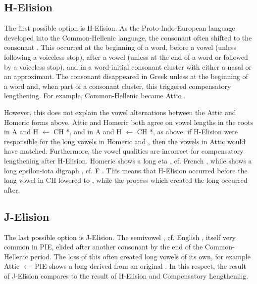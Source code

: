 \subsection{H-Elision}
 The first possible option is H-Elision. As the Proto-Indo-European language developed into the Common-Hellenic language, the consonant  often shifted to the consonant . This occurred at the beginning of a word, before a vowel (unless following a voiceless stop), after a vowel (unless at the end of a word or followed by a voiceless stop), and in a word-initial consonant cluster with either a nasal or an approximant.\autocite[168-172]{Smyth_2013}  The consonant  disappeared in Greek unless at the beginning of a word and, when part of a consonant cluster, this triggered compensatory lengthening. For example, Common-Hellenic  became Attic .\autocite[]{Beekes_2009}

 However, this does not explain the vowel alternations between the Attic and Homeric forms above. Attic and Homeric both agree on vowel lengths in the roots  in A  and H  $\gets$ CH *,\autocite[]{Beekes_2009} and  in A and H  $\gets$ CH *, as above. if H-Elision were responsible for the long vowels in Homeric  and , then the vowels in Attic would have matched. Furthermore, the vowel qualities are incorrect for compensatory lengthening after H-Elision. Homeric  shows a long eta , cf. French , while  shows a long epsilon-iota digraph , cf. F . This means that H-Elision occurred before the long vowel  in CH lowered to , while the process which created the long  occurred after.

\subsection{J-Elision}
The last possible option is J-Elision. The semivowel , cf. English , itself very common in PIE, elided after another consonant by the end of the Common-Hellenic period.\autocite[196]{Smyth_2013} The loss of this often created long vowels of its own, for example Attic  $\gets$ PIE  shows a long  derived from an original  .\autocite[τείνω]{Beekes_2009} In this respect, the result of J-Elision compares to the result of H-Elision and Compensatory Lengthening.

